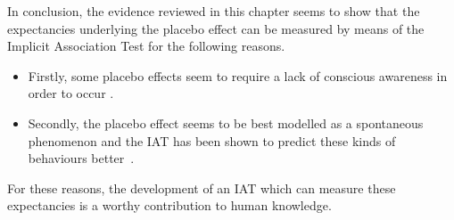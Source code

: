 
In conclusion, the evidence reviewed in this chapter seems to show that the expectancies underlying the placebo effect can be measured by means of the Implicit Association Test for the following reasons. 
\begin{itemize}
\item Firstly, some placebo effects seem to require a lack of conscious awareness in order to occur \cite{Shiv2005a,Geers2005a}.
\item  Secondly, the placebo effect seems to be best modelled as a spontaneous phenomenon and the IAT has been shown to predict these kinds of behaviours better~\cite{Asendorpf2002,Richetin2007}.
\end{itemize}

For these reasons, the development of an IAT which can measure these expectancies is a worthy contribution to human knowledge. 







